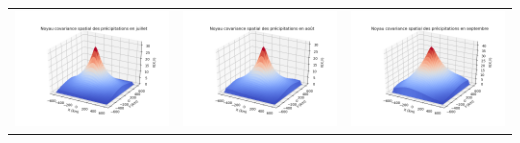 \documentclass[a4paper,10pt]{article}
\begin{document}
\begin{tabular}{ccc}
		\includegraphics[scale=0.4]{images/kernel_precip_m7.png} & \includegraphics[scale=0.4]{images/kernel_precip_m8.png} & \includegraphics[scale=0.4]{images/kernel_precip_m9.png} \\ 

\end{tabular}
\end{document}
